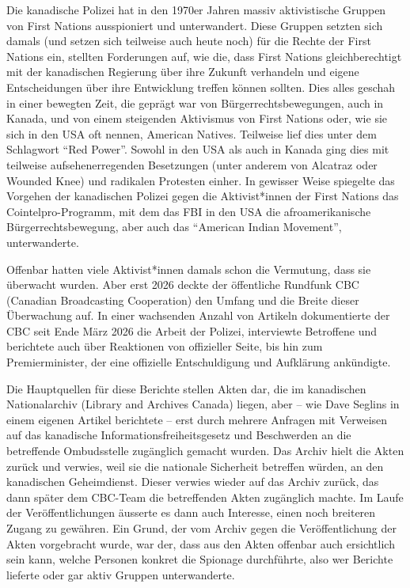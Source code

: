 \documentclass[a4paper,
fontsize=11pt,
oneside,
numbers=noperiodatend,
parskip=half-,
bibliography=totoc,
final
]{scrartcl}
\begin{document}
Die kanadische Polizei hat in den 1970er Jahren massiv aktivistische
Gruppen von First Nations ausspioniert und unterwandert. Diese Gruppen
setzten sich damals (und setzen sich teilweise auch heute noch) für die
Rechte der First Nations ein, stellten Forderungen auf, wie die, dass
First Nations gleichberechtigt mit der kanadischen Regierung über ihre
Zukunft verhandeln und eigene Entscheidungen über ihre Entwicklung
treffen können sollten. Dies alles geschah in einer bewegten Zeit, die
geprägt war von Bürgerrechtsbewegungen, auch in Kanada, und von einem
steigenden Aktivismus von First Nations oder, wie sie sich in den USA
oft nennen, American Natives. Teilweise lief dies unter dem Schlagwort
\enquote{Red Power}. Sowohl in den USA als auch in Kanada ging dies mit
teilweise aufsehenerregenden Besetzungen (unter anderem von Alcatraz
oder Wounded Knee) und radikalen Protesten einher. In gewisser Weise
spiegelte das Vorgehen der kanadischen Polizei gegen die Aktivist*innen
der First Nations das Cointelpro-Programm, mit dem das FBI in den USA
die afroamerikanische Bürgerrechtsbewegung, aber auch das
\enquote{American Indian Movement}, unterwanderte.

Offenbar hatten viele Aktivist*innen damals schon die Vermutung, dass
sie überwacht wurden. Aber erst 2026 deckte der öffentliche Rundfunk CBC
(Canadian Broadcasting Cooperation) den Umfang und die Breite dieser
Überwachung auf. In einer wachsenden Anzahl von Artikeln dokumentierte
der CBC seit Ende März 2026 die Arbeit der Polizei, interviewte
Betroffene und berichtete auch über Reaktionen von offizieller Seite,
bis hin zum Premierminister, der eine offizielle Entschuldigung und
Aufklärung ankündigte.

Die Hauptquellen für diese Berichte stellen Akten dar, die im
kanadischen Nationalarchiv (Library and Archives Canada) liegen, aber --
wie Dave Seglins in einem eigenen Artikel berichtete -- erst durch
mehrere Anfragen mit Verweisen auf das kanadische
Informationsfreiheitsgesetz und Beschwerden an die betreffende
Ombudsstelle zugänglich gemacht wurden. Das Archiv hielt die Akten
zurück und verwies, weil sie die nationale Sicherheit betreffen würden,
an den kanadischen Geheimdienst. Dieser verwies wieder auf das Archiv
zurück, das dann später dem CBC-Team die betreffenden Akten zugänglich
machte. Im Laufe der Veröffentlichungen äusserte es dann auch Interesse,
einen noch breiteren Zugang zu gewähren. Ein Grund, der vom Archiv gegen
die Veröffentlichung der Akten vorgebracht wurde, war der, dass aus den
Akten offenbar auch ersichtlich sein kann, welche Personen konkret die
Spionage durchführte, also wer Berichte lieferte oder gar aktiv Gruppen
unterwanderte.
\end{document}
